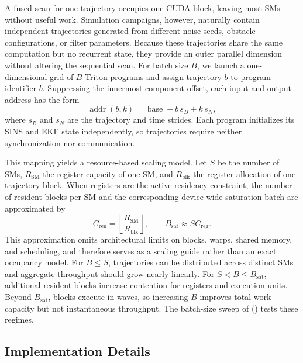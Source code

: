 A fused scan for one trajectory occupies one CUDA block, leaving most SMs without useful work. Simulation campaigns, however, naturally contain independent trajectories generated from different noise seeds, obstacle configurations, or filter parameters. Because these trajectories share the same computation but no recurrent state, they provide an outer parallel dimension without altering the sequential scan. For batch size $B$, we launch a one-dimensional grid of $B$ Triton programs and assign trajectory $b$ to program identifier $b$. Suppressing the innermost component offset, each input and output address has the form
\begin{equation}
  \operatorname{addr}(b,k)=\operatorname{base}+b\,s_B+k\,s_N,
  \label{eq:batch-address}
\end{equation}
where $s_B$ and $s_N$ are the trajectory and time strides. Each program initializes its SINS and EKF state independently, so trajectories require neither synchronization nor communication.

This mapping yields a resource-based scaling model. Let $S$ be the number of SMs, $R_{\mathrm{SM}}$ the register capacity of one SM, and $R_{\mathrm{blk}}$ the register allocation of one trajectory block. When registers are the active residency constraint, the number of resident blocks per SM and the corresponding device-wide saturation batch are approximated by
\begin{equation}
  C_{\mathrm{reg}}=\left\lfloor
  \frac{R_{\mathrm{SM}}}{R_{\mathrm{blk}}}\right\rfloor,
  \qquad B_{\mathrm{sat}}\approx S C_{\mathrm{reg}}.
  \label{eq:batch-saturation}
\end{equation}
This approximation omits architectural limits on blocks, warps, shared memory, and scheduling, and therefore serves as a scaling guide rather than an exact occupancy model. For $B\leq S$, trajectories can be distributed across distinct SMs and aggregate throughput should grow nearly linearly. For $S<B\leq B_{\mathrm{sat}}$, additional resident blocks increase contention for registers and execution units. Beyond $B_{\mathrm{sat}}$, blocks execute in waves, so increasing $B$ improves total work capacity but not instantaneous throughput. The batch-size sweep of  () tests these regimes.

\subsection{Implementation Details}
\label{subsec:implementation-details}


